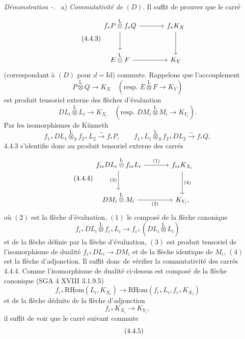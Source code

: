 \documentclass[11pt]{article}
\newenvironment{prooftext}[1][Proof]{\par\noindent\emph{#1.}\ }{\par\medskip}
\newcommand{\R}{\mathrm{R}}\newcommand{\RHomCore}{\mathrm{RHom}}
\providecommand{\RHom}{\RHomCore}
\providecommand{\uRHom}{\underline{\RHom}}
\providecommand{\Id}{\mathrm{Id}}
\providecommand{\lisom}{\xrightarrow{\sim}}
\providecommand{\RHom}{\RHomCore}
\providecommand{\RHom}{\R\mathcal{H}om}
\providecommand{\R}{\mathrm R}
\providecommand{\RHom}{\RHomCore}
\begin{document}
\begin{prooftext}[Démonstration -]
a) \emph{Commutativité de} $(D)$. Il suffit de prouver que le carré
\begin{equation}
\tag{4.4.3}
\begin{tikzcd}[column sep=large,row sep=large]
f_*P\overset{\mathrm{L}}{\otimes}f_*Q \arrow[r] \arrow[d] & f_*K_X \arrow[d]\\
E\overset{\mathrm{L}}{\otimes}F \arrow[r] & K_Y
\end{tikzcd}
\end{equation}
(correspondant à $(D)$ pour $d=\Id$) commute. Rappelons que l'accouplement
\[
P\overset{\mathrm{L}}{\otimes}Q\longrightarrow K_X
\quad(\text{resp. }E\overset{\mathrm{L}}{\otimes}F\longrightarrow K_Y)
\]
est produit tensoriel externe des flèches d'évaluation
\[
DL_i\overset{\mathrm{L}}{\otimes}L_i\longrightarrow K_{X_i}
\quad(\text{resp. }DM_i\overset{\mathrm{L}}{\otimes}M_i\longrightarrow K_{Y_i}).
\]
Par les isomorphismes de Künneth
\[
f_{1*}DL_1\overset{\mathrm{L}}{\otimes}_S f_{2*}L_2 \lisom f_*P,\qquad
f_{1*}L_1\overset{\mathrm{L}}{\otimes}_S f_{2*}DL_2 \lisom f_*Q,
\]
4.4.3 s'identifie donc au produit tensoriel externe des carrés
\begin{equation}
\tag{4.4.4}
\begin{tikzcd}[column sep=large,row sep=large]
f_{i*}DL_i\overset{\mathrm{L}}{\otimes} f_{i*}L_i
 \arrow[r,"(1)"] \arrow[d,"(3)"'] &
f_{i*}K_{X_i} \arrow[d,"(4)"]\\
DM_i\overset{\mathrm{L}}{\otimes}M_i \arrow[r,"(2)"'] & K_{Y_i},
\end{tikzcd}
\end{equation}
où $(2)$ est la flèche d'évaluation, $(1)$ le composé de la flèche canonique
\[
f_{i*}DL_i\overset{\mathrm{L}}{\otimes} f_{i*}L_i\longrightarrow f_{i*}(DL_i\overset{\mathrm{L}}{\otimes}L_i)
\]
et de la flèche
définie par la flèche d'évaluation, $(3)$ est produit tensoriel de l'isomorphisme de dualité $f_{i*}DL_i\longrightarrow DM_i$ et de la flèche identique de $M_i$, $(4)$ est la flèche d'adjonction. Il suffit donc de vérifier la commutativité des carrés 4.4.4. Comme l'isomorphisme de dualité ci-dessus est composé de la flèche canonique (SGA 4 XVIII 3.1.9.5)
\[
f_{i*}\uRHom(L_i,K_{X_i})\longrightarrow \uRHom(f_{i*}L_i,f_{i*}K_{X_i})
\]
et de la flèche déduite de la flèche d'adjonction
\[
f_{i*}K_{X_i}\longrightarrow K_{Y_i},
\]
il suffit de voir que le carré suivant commute
\begin{equation}
\tag{4.4.5}
\begin{tikzcd}[column sep=large,row sep=large]

\end{tikzcd}
\end{equation}
\end{prooftext}
\end{document}
